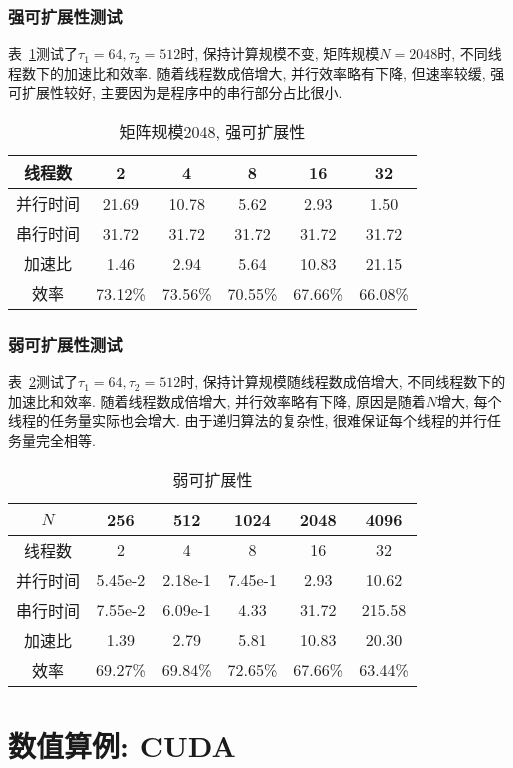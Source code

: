 \documentclass[szjs]{cjcmltx}
\begin{document}
\subsubsection{强可扩展性测试}
表~\ref{tab:5}测试了$\tau_1=64,\tau_2=512$时, 保持计算规模不变, 矩阵规模$N=2048$时, 不同线程数下的加速比和效率. 随着线程数成倍增大, 并行效率略有下降, 但速率较缓, 强可扩展性较好, 主要因为是程序中的串行部分占比很小.
\begin{table}[htbp]\centering\caption{矩阵规模2048, 强可扩展性}\label{tab:5}\begin{tabular}{|c|c|c|c|c|c|}
\hline
线程数 & 2 & 4 & 8 & 16 & 32\\
\hline
并行时间 & 21.69 & 10.78 & 5.62 & 2.93 & 1.50\\
\hline
串行时间 & 31.72 & 31.72 & 31.72 & 31.72 & 31.72\\
\hline
加速比 & 1.46 & 2.94 & 5.64 & 10.83 & 21.15\\
\hline
效率 & 73.12\% & 73.56\% & 70.55\% & 67.66\% & 66.08\%\\
\hline
\end{tabular}\end{table}

\subsubsection{弱可扩展性测试}
表~\ref{tab:6}测试了$\tau_1=64,\tau_2=512$时, 保持计算规模随线程数成倍增大, 不同线程数下的加速比和效率. 随着线程数成倍增大, 并行效率略有下降, 原因是随着$N$增大, 每个线程的任务量实际也会增大. 由于递归算法的复杂性, 很难保证每个线程的并行任务量完全相等.
\begin{table}[htbp]\centering\caption{弱可扩展性}\label{tab:6}\begin{tabular}{|c|c|c|c|c|c|}\hline
$N$ & 256 & 512 & 1024 & 2048 & 4096\\
\hline
线程数 & 2 & 4 & 8 & 16 & 32\\
\hline
并行时间 & 5.45e-2 & 2.18e-1 & 7.45e-1 & 2.93 & 10.62\\
\hline
串行时间 & 7.55e-2 & 6.09e-1 & 4.33 & 31.72 & 215.58\\
\hline
加速比 & 1.39 & 2.79 & 5.81 & 10.83 & 20.30\\
\hline
效率 & 69.27\% & 69.84\% & 72.65\% & 67.66\% & 63.44\%\\
\hline
\end{tabular}\end{table}

\section{数值算例: CUDA}
\end{document}

